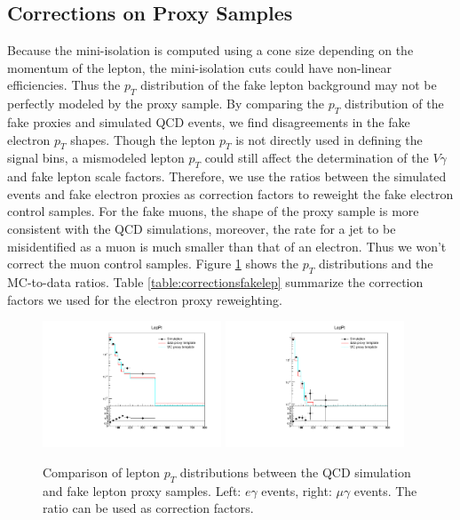 \documentclass[thesis.tex]{subfiles}
\renewcommand\_{\textunderscore\allowbreak}
\begin{document}
\subsection{Corrections on Proxy Samples}
Because the mini-isolation is computed using a cone size depending on the momentum of the lepton, the mini-isolation cuts could have non-linear efficiencies. Thus the $p_T$ distribution of the fake lepton background may not be perfectly modeled by the proxy sample. By comparing the $p_T$ distribution of the fake proxies and simulated QCD events, we find disagreements in the fake electron $p_T$ shapes. Though the lepton $p_T$ is not directly used in defining the signal bins, a mismodeled lepton $p_T$ could still affect the determination of the $V\gamma$ and fake lepton scale factors. Therefore, we use the ratios between the simulated events and fake electron proxies as correction factors to reweight the fake electron control samples. For the fake muons, the shape of the proxy sample is more consistent with the QCD simulations, moreover, the rate for a jet to be misidentified as a muon is much smaller than that of an electron. Thus we won't correct the muon control samples. 
Figure \ref{fig:reweight_fakelep} shows the $p_T$ distributions and the MC-to-data ratios. Table \ref{table:correctionsfakelep} summarize the correction factors we used for the electron proxy reweighting.

\begin{figure}[hbtp]\begin{center}
    \includegraphics[width=0.475\textwidth]{Figures/faketemp_electron_LepPt.pdf}
    \includegraphics[width=0.475\textwidth]{Figures/faketemp_muon_LepPt.pdf}
    \caption{Comparison of lepton $p_T$ distributions between the QCD simulation and fake lepton proxy samples. Left: $e\gamma$ events, right: $\mu\gamma$ events. The ratio can be used as correction factors.}
        \label{fig:reweight_fakelep}
\end{center}\end{figure}
\end{document}
